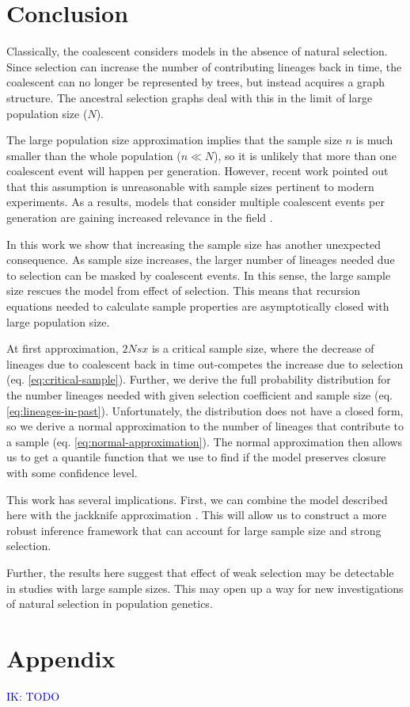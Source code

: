 \documentclass[review]{elsarticle}
\newcommand{\ikcomment}[1]{\textcolor{blue}{IK: #1}}
\begin{document}
\section{Conclusion}
\label{sec:conclusion}

Classically, the coalescent considers models in the absence of natural selection. Since selection
can increase the number of contributing lineages back in time, the coalescent can no longer be
represented by trees, but instead acquires a graph structure. The ancestral selection graphs
\citep{KroneNeuhauser1997} deal with this in the limit of large population size ($N$).

The large population size approximation implies that the sample size $n$ is much smaller than the
whole population ($n \ll N$), so it is unlikely that more than one coalescent event will happen per
generation. However, recent work \citep{BhaskarEtAl2014,NelsonEtAl2019} pointed out that this
assumption is unreasonable with sample sizes pertinent to modern experiments. As a results, models
that consider multiple coalescent events per generation are gaining increased relevance in the
field \citep{FlemmingtonVoitCoalescentPapers}.

In this work we show that increasing the sample size has another unexpected consequence. As sample
size increases, the larger number of lineages needed due to selection can be masked by coalescent
events. In this sense, the large sample size rescues the model from effect of selection. This means
that recursion equations needed to calculate sample properties are asymptotically closed with large
population size.

At first approximation, $2Nsx$ is a critical sample size, where the decrease of lineages due to
coalescent back in time out-competes the increase due to selection (eq. \eqref{eq:critical-sample}).
Further, we derive the full probability distribution for the number lineages needed with given
selection coefficient and sample size (eq. \eqref{eq:lineages-in-past}). Unfortunately, the
distribution does not have a closed form, so we derive a normal approximation to the number of
lineages that contribute to a sample (eq. \eqref{eq:normal-approximation}). The normal approximation
then allows us to get a quantile function that we use to find if the model preserves closure with
some confidence level.

This work has several implications. First, we can combine the model described here with the
jackknife approximation \citep{JouganousEtAl2017}. This will allow us to construct a more robust
inference framework that can account for large sample size and strong selection.

Further, the results here suggest that effect of weak selection may be detectable in studies with
large sample sizes. This may open up a way for new investigations of natural selection in population
genetics.

\section{Appendix}

\ikcomment{TODO}



\end{document}
